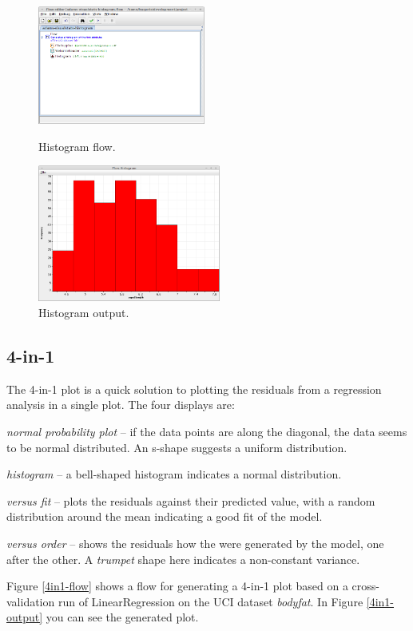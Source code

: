 \documentclass[a4paper]{book}
\begin{document}
\begin{figure}[ht]
  \begin{minipage}[t]{0.5\linewidth}
    \centering
    \includegraphics[width=5.5cm]{images/histogram-flow.png}
    \caption{Histogram flow.}
    \label{histogram-flow}
  \end{minipage}
  \hspace{0.5cm}
  \begin{minipage}[t]{0.5\linewidth}
    \centering
    \includegraphics[width=6.0cm]{images/histogram-output.png}
    \caption{Histogram output.}
    \label{histogram-output}
  \end{minipage}
\end{figure}

\clearpage
\subsection{4-in-1}
The 4-in-1 plot is a quick solution to plotting the residuals from a regression 
analysis\cite{regression} in a single plot. The four displays are:
\begin{tight_itemize}
	\item \textit{normal probability plot} -- if the data points are along
	the diagonal, the data seems to be normal distributed. An s-shape suggests
	a uniform distribution.
	\item \textit{histogram} -- a bell-shaped histogram indicates a normal
	distribution.
	\item \textit{versus fit} -- plots the residuals against their predicted
	value, with a random distribution around the mean indicating a good fit
	of the model.
	\item \textit{versus order} -- shows the residuals how the were generated
	by the model, one after the other. A \textit{trumpet} shape here indicates
	a non-constant variance.
\end{tight_itemize}
Figure \ref{4in1-flow} shows a flow for generating a 4-in-1 plot based on a
cross-validation run of LinearRegression on the UCI dataset \textit{bodyfat}.
In Figure \ref{4in1-output} you can see the generated plot.
\end{document}
